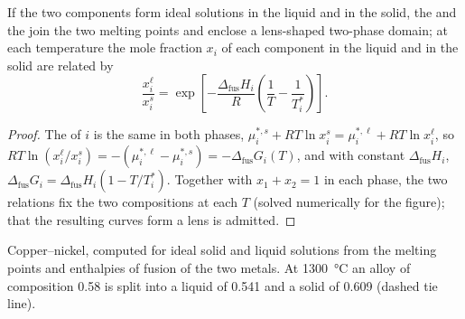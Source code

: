 \begin{proposition}\label{prop:b2:solid-liquid-diagrams:lens}
If the two components form ideal solutions in the liquid and in the solid,
the  and the  join the two melting points and enclose a
lens-shaped two-phase domain; at each temperature the mole fraction $x_i$ of
each component in the liquid and in the solid are related by
\[
  \frac{x_i^{\ell}}{x_i^{s}} = \exp\left[-\frac{\Delta_{\text{fus}}H_i}{R}\left(\frac1T - \frac1{T_i^*}\right)\right] .
\]
\end{proposition}

\begin{proof}
The  of $i$ is the same in both phases, $\mu_i^{*,s} +
RT\ln x_i^s = \mu_i^{*,\ell} + RT\ln x_i^\ell$, so $RT\ln(x_i^\ell/x_i^s) =
-(\mu_i^{*,\ell} - \mu_i^{*,s}) = -\Delta_{\text{fus}}G_i(T)$, and with constant
$\Delta_{\text{fus}}H_i$, $\Delta_{\text{fus}}G_i = \Delta_{\text{fus}}H_i(1 - T/T_i^*)$.
Together with $x_1 + x_2 = 1$ in each phase, the two relations fix the two
compositions at each $T$ (solved numerically for the figure); that the
resulting curves form a lens is admitted.
\end{proof}

\begin{omfigure}

{\small Copper--nickel, computed for ideal solid and liquid solutions from the
melting points and enthalpies of fusion of the two metals. At
\qty{1300}{\degreeCelsius} an alloy of composition 0.58 is split into a liquid
of 0.541 and a solid of 0.609 (dashed tie line).}
\end{omfigure}

